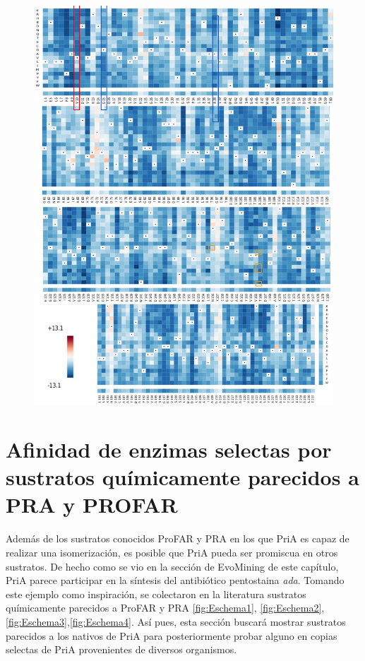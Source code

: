 \documentclass[12pt,twoside]{reedthesis}
\begin{document}
  \begin{figure}[h!tbp]
  \centering
  \includegraphics[angle = 0,scale = .8]{chapter4/Couplings/PriAMutations.pdf}
  \caption[Tendencia de mutaciones observada en secuencias de PriA]{\footnotesize{}}
  \label{fig:CouplingsMutationsPriA}
  \end{figure}
  
  \section{Afinidad de enzimas selectas por sustratos químicamente
  parecidos a PRA y
  PROFAR}\label{afinidad-de-enzimas-selectas-por-sustratos-quimicamente-parecidos-a-pra-y-profar}
  
  Además de los sustratos conocidos ProFAR y PRA en los que PriA es capaz
  de realizar una isomerización, es posible que PriA pueda ser promiscua
  en otros sustratos. De hecho como se vio en la sección de EvoMining de
  este capítulo, PriA parece participar en la síntesis del antibiótico
  pentostaina \emph{ada}. Tomando este ejemplo como inspiración, se
  colectaron en la literatura sustratos químicamente parecidos a ProFAR y
  PRA \autoref{fig:Eschema1},
  \autoref{fig:Eschema2},\autoref{fig:Eschema3},\autoref{fig:Eschema4}.
  Así pues, esta sección buscará mostrar sustratos parecidos a los nativos
  de PriA para posteriormente probar alguno en copias selectas de PriA
  provenientes de diversos organismos.
  
\end{document}
